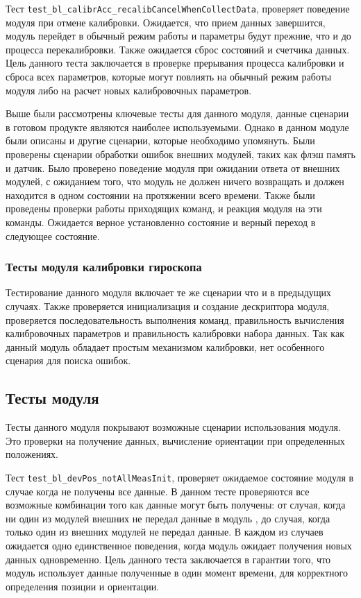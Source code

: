 Тест \lstinline|test_bl_calibrAcc_recalibCancelWhenCollectData|, проверяет поведение модуля при отмене калибровки. Ожидается, что прием данных завершится,
модуль перейдет в обычный режим работы и параметры будут прежние, что и до процесса перекалибровки. Также ожидается сброс состояний и счетчика данных. Цель данного
теста заключается в проверке прерывания процесса калибровки и сброса всех параметров, которые могут повлиять на обычный режим работы модуля либо на расчет новых калибровочных параметров.

Выше были рассмотрены ключевые тесты для данного модуля, данные сценарии в готовом продукте являются наиболее используемыми. Однако в данном модуле были описаны и другие
сценарии, которые необходимо упомянуть. Были проверены сценарии обработки ошибок внешних модулей, таких как флэш память и датчик. Было проверено поведение модуля при
ожидании ответа  от внешних модулей, с ожиданием того, что модуль не должен ничего возвращать и должен находится в одном состоянии на протяжении всего времени.
Также были проведены проверки работы приходящих команд, и реакция модуля на эти команды. Ожидается верное установленно состояние и верный переход в следующее состояние.

\subsubsection{Тесты модуля калибровки гироскопа}

Тестирование данного модуля включает те же сценарии что и в предыдущих случаях. Также проверяется инициализация и создание дескриптора модуля, проверяется
последовательность выполнения команд, правильность вычисления калибровочных параметров и правильность калибровки набора данных. Так как данный модуль обладает
простым механизмом калибровки, нет особенного сценария для поиска ошибок.  

\subsection{Тесты модуля \moduleOrientationAzimuth}

Тесты данного модуля покрывают возможные сценарии использования модуля. Это проверки на получение данных, вычисление ориентации при определенных положениях.

Тест \lstinline|test_bl_devPos_notAllMeasInit|, проверяет ожидаемое состояние модуля в случае когда не получены все данные. В данном тесте проверяются все возможные 
комбинации того как данные могут быть получены: от случая, когда ни один из модулей внешних не передал данные в модуль \moduleOrientationAzimuth, до случая, когда только
один из внешних модулей не передал данные. В каждом из случаев ожидается одно единственное поведения, когда модуль ожидает получения новых данных одновременно.
Цель данного теста заключается в гарантии того, что модуль использует данные полученные в один момент времени, для корректного определения позиции и ориентации.


